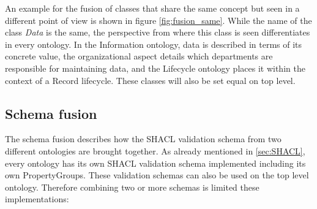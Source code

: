 \documentclass[
  a4paper,  %
  twoside,  %
  bibliography=totoc,
  headsepline,
  cleardoublepage=empty,
  parskip=half,
  draft=false
]{scrbook}
\begin{document}
An example for the fusion of classes that share the same concept but seen in a different point of view is shown in figure \ref{fig:fusion_same}. While the name of the class \textit{Data} is the same, the perspective from where this class is seen differentiates in every ontology. In the Information ontology, data is described in terms of its concrete value, the organizational aspect details which departments are responsible for maintaining data, and the Lifecycle ontology places it within the context of a Record lifecycle. These classes will also be set equal on top level.

\subsection{Schema fusion}
The schema fusion describes how the \acrshort{SHACL} validation schema from two different ontologies are brought together. As already mentioned in \ref{sec:SHACL}, every ontology has its own \acrshort{SHACL} validation schema implemented including its own PropertyGroups. These validation schemas can also be used on the top level ontology. Therefore combining two or more schemas is limited these implementations: 
\end{document}
